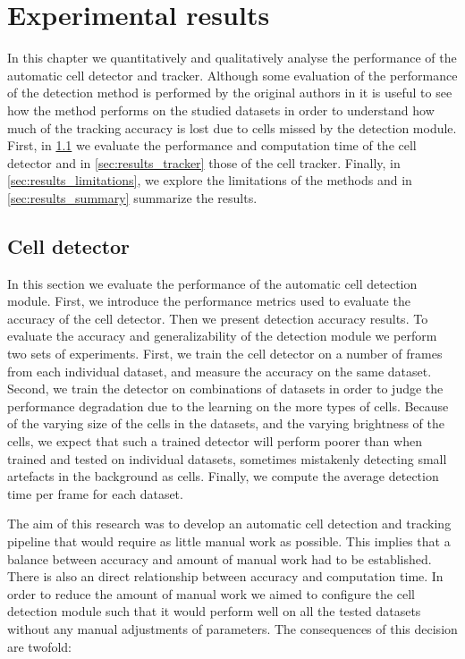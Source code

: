 \chapter{Experimental results \statusfirstdraft}
\label{chap:results}

In this chapter we quantitatively and qualitatively analyse the performance of the automatic cell detector and tracker. Although some evaluation of the performance of the detection method is performed by the original authors in \cite{arteta12} it is useful to see how the method performs on the studied datasets in order to understand how much of the tracking accuracy is lost due to cells missed by the detection module. First, in \cref{sec:results_detector} we evaluate the performance and computation time of the cell detector and in \cref{sec:results_tracker} those of the cell tracker. Finally, in \cref{sec:results_limitations}, we explore the limitations of the methods and in \cref{sec:results_summary} summarize the results.

\section{Cell detector \statusfirstdraft}
	\label{sec:results_detector}
	
	In this section we evaluate the performance of the automatic cell detection module. First, we introduce the performance metrics used to evaluate the accuracy of the cell detector. Then we present detection accuracy results. To evaluate the accuracy and generalizability of the detection module we perform two sets of experiments. First, we train the cell detector on a number of frames from each individual dataset, and measure the accuracy on the same dataset. Second, we train the detector on combinations of datasets in order to judge the performance degradation due to the learning on the more types of cells. Because of the varying size of the cells in the datasets, and the varying brightness of the cells, we expect that such a trained detector will perform poorer than when trained and tested on individual datasets, sometimes mistakenly detecting small artefacts in the background as cells. Finally, we compute the average detection time per frame for each dataset.
	
	The aim of this research was to develop an automatic cell detection and tracking pipeline that would require as little manual work as possible. This implies that a balance between accuracy and amount of manual work had to be established. There is also an direct relationship between accuracy and computation time. In order to reduce the amount of manual work we aimed to configure the cell detection module such that it would perform well on all the tested datasets without any manual adjustments of parameters. The consequences of this decision are twofold:
	
